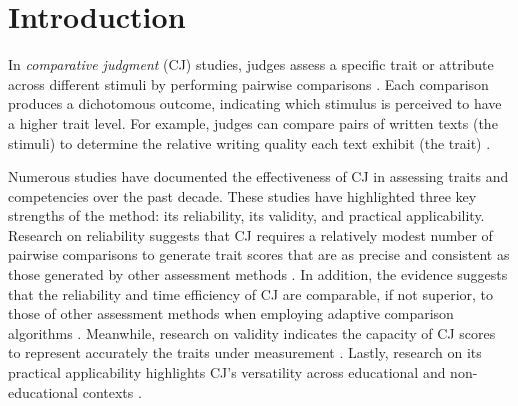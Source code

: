 \documentclass[
  authoryear,
  review,
  1p]{elsarticle}
\begin{document}
\newcommand{\dsep}{\:\bot\:}
\newcommand{\ndsep}{\:\not\bot\:}

\section{Introduction}\label{sec-introduction}

In \emph{comparative judgment} (CJ) studies, judges assess a specific
trait or attribute across different stimuli by performing pairwise
comparisons \citep{Thurstone_1927a, Thurstone_1927b}. Each comparison
produces a dichotomous outcome, indicating which stimulus is perceived
to have a higher trait level. For example, judges can compare pairs of
written texts (the stimuli) to determine the relative writing quality
each text exhibit (the trait)
\citep{Pollitt_2012b, vanDaal_et_al_2016, Lesterhuis_2018_thesis, Coertjens_et_al_2017, Goossens_et_al_2018, Bouwer_et_al_2023}.

Numerous studies have documented the effectiveness of CJ in assessing
traits and competencies over the past decade. These studies have
highlighted three key strengths of the method: its reliability, its
validity, and practical applicability. Research on reliability suggests
that CJ requires a relatively modest number of pairwise comparisons
\citep{Verhavert_et_al_2019, Crompvoets_et_al_2022} to generate trait
scores that are as precise and consistent as those generated by other
assessment methods
\citep{Coertjens_et_al_2017, Goossens_et_al_2018, Bouwer_et_al_2023}. In
addition, the evidence suggests that the reliability and time efficiency
of CJ are comparable, if not superior, to those of other assessment
methods when employing adaptive comparison algorithms
\citep{Pollitt_2012b, Verhavert_et_al_2022, Mikhailiuk_et_al_2021}.
Meanwhile, research on validity indicates the capacity of CJ scores to
represent accurately the traits under measurement
\citep{Whitehouse_2012, vanDaal_et_al_2016, Lesterhuis_2018_thesis, Bartholomew_et_al_2018, Bouwer_et_al_2023}.
Lastly, research on its practical applicability highlights CJ's
versatility across educational and non-educational contexts
\citep{Kimbell_2012, Jones_et_al_2015, Bartholomew_et_al_2018, Jones_et_al_2019, Marshall_et_al_2020, Bartholomew_et_al_2020b, Boonen_et_al_2020}.
\end{document}
